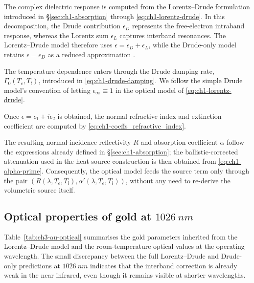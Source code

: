 The complex dielectric response is computed from the Lorentz--Drude
formulation introduced in \S\ref{sec:ch1-absorption} through
\eqref{eq:ch1-lorentz-drude}. In this decomposition, the Drude
contribution \(\epsilon_D\) represents the free-electron intraband
response, whereas the Lorentz sum \(\epsilon_L\) captures interband
resonances. The Lorentz--Drude model therefore uses
\(\epsilon = \epsilon_D + \epsilon_L\), while the Drude-only model
retains \(\epsilon = \epsilon_D\) as a reduced approximation
\cite{Tsibidis_2018}.

The temperature dependence enters through the Drude damping rate,
\(\Gamma_0(T_e, T_l)\), introduced in \eqref{eq:ch1-drude-damping}.
We follow the simple Drude model's convention of letting \(\epsilon_\infty \equiv 1\) in the optical model of \eqref{eq:ch1-lorentz-drude}.

Once \(\epsilon = \epsilon_1 + i \epsilon_2\) is obtained, the normal
refractive index and extinction coefficient are computed by \eqref{eq:ch1-coeffs_refractive_index}.

The resulting normal-incidence reflectivity \(R\) and absorption
coefficient \(\alpha\) follow the expressions already defined in
\S\ref{sec:ch1-absorption}; the ballistic-corrected attenuation used in
the heat-source construction is then obtained from
\eqref{eq:ch1-alpha-prime}. Consequently, the optical model feeds the
source term only through the pair
\((R(\lambda, T_e, T_l), \alpha'(\lambda, T_e, T_l))\), without any need
to re-derive the volumetric source itself.

\subsection{Optical properties of gold at \texorpdfstring{\(\SI{1026}{nm}\)}{1026 nm}}
\label{sec:ch3-optical-au}

Table~\ref{tab:ch3-au-optical} summarises the gold parameters inherited
from the Lorentz--Drude model and the room-temperature optical values at
the operating wavelength. The small discrepancy between the full
Lorentz--Drude and Drude-only predictions at \(\SI{1026}{nm}\) indicates
that the interband correction is already weak in the near infrared, even
though it remains visible at shorter wavelengths.

